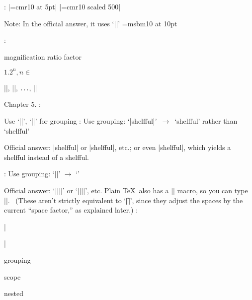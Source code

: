 


:
|\font\tenrm=cmr10 at 5pt|\parbreak
|\font\tenrm=cmr10 scaled 500|

Note: In the official answer, it uses `|\squinttenrm|'
\myhr
\font\msb=msbm10 at 10pt
\def\ldots{\mathinner{\ldotp\ldotp\ldotp}}

:
\item\bull magnification ratio factor
\item\bull $1.2^n, n \in $
\item\bull ||, ||, $\ldots$, ||
\myhr
\vfill
\eject


\noindent Chapter 5.
\myhr
{}:
\item\bull Use `|{|', `|}|' for grouping
\myhr
{}:
Use grouping: `|shelf{f}ul|'\ $\rightarrow$\ `shelf{f}ul' rather than `shelfful'\parbreak

Official answer: |{shelf}ful| or |shelf{}ful|, etc.; or even
|shelf\/ful|, which yields a shelf\/ful instead of a
shelf{\kern0pt}ful.

:
Use grouping: `|{\]}{\]}{\]}|' $\rightarrow$ `{\]}{\]}{\]}'\parbreak

Official answer: `\]|{|\]|}|\]' or `\]|{}|\]|{}|\]', etc. Plain \TeX\
also has a |\space| macro, so you can type |\space\space\space|.  \
(These aren't strictly equivalent to `|\|\]|\|\]|\|\]', since they
adjust the spaces by the current ``{space factor},'' as explained
later.)
\myhr
{}:

\item\bull |\centerline|
\item\bull grouping
\item\bull scope
\item\bull nested

